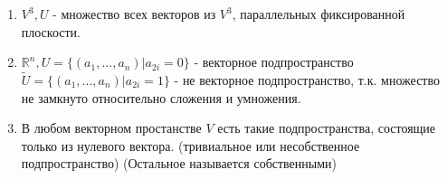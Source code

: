 \documentclass[a4paper, 12pt]{article}
\newcommand{\R}{\mathbb R}
\theoremstyle{definition}
\begin{document}
    \begin{enumerate} 
      \item $V^3, U$ - множество всех векторов из $V^3$, параллельных фиксированной\\ плоскости.
      \item $\R^n, U=\{(a_1,..., a_n) | a_{2i} = 0\}$ - векторное подпространство \\ $\widetilde{U} = \{(a_1,..., a_n) | a_{2i} = 1\}$ - не векторное подпространство, т.к. множество не замкнуто относительно сложения и умножения.
      \item В любом векторном простанстве $V$ есть такие подпространства, состоящие только из нулевого вектора. (тривиальное или несобственное подпространство) (Остальное называется собственными)
    \end{enumerate}
  
  \newpage
\end{document}
